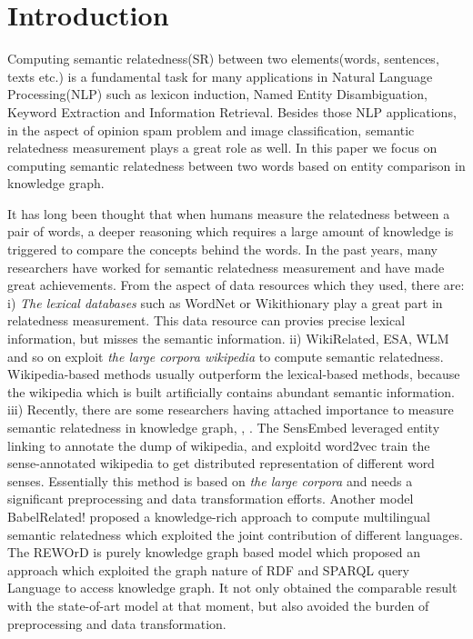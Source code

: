 \section{Introduction}
Computing semantic relatedness(SR) between two elements(words, sentences,
texts etc.) is a fundamental task for many applications in Natural Language
Processing(NLP) such as lexicon induction\cite{aaai/QadirMGL15}, Named 
Entity Disambiguation\cite{acl/HanZ10}, Keyword Extraction
\cite{ijcai/ZhangFW13} and Information Retrieval\cite{acl/GurevychMZ07}. 
Besides those NLP applications, in the aspect of opinion spam problem\cite{www/SandulescuE15}
and image classification\cite{iwcs/LeongM11}, semantic relatedness measurement plays a great role as well. 
In this paper we focus on computing semantic relatedness between two words based on entity comparison in knowledge graph.

It has long been thought that when humans measure the relatedness between a pair of words,
a deeper reasoning which requires a large amount of knowledge is triggered to compare the concepts behind the words.
In the past years, many researchers have worked for semantic relatedness measurement and have made great achievements.
From the aspect of data resources which they used, there are:
i) \emph{The lexical databases} such as WordNet\cite{acl/Pucher07} or Wikithionary\cite{aaai/ZeschMG08} play a great part in
relatedness measurement. This data resource can provies precise lexical information, but misses the semantic information.
ii) WikiRelated\cite{aaai/StrubeP06}, ESA\cite{ijcai/GabrilovichM07}, WLM\cite{aaai/ZeschMG08} and so on exploit \emph{the large corpora wikipedia}
to compute semantic relatedness. Wikipedia-based methods usually outperform the lexical-based methods, 
because the wikipedia which is built artificially contains abundant semantic information. 
iii) Recently, there are some researchers having attached importance to measure semantic relatedness
in knowledge graph\cite{acl/IacobacciPN15}, \cite{aaai/NavigliP12}, \cite{aaai/Pirro12}. 
The SensEmbed \cite{acl/IacobacciPN15} leveraged entity linking to annotate the dump of wikipedia,
and exploitd word2vec\cite{corr/Mikolov13} train the sense-annotated wikipedia to get distributed representation of different 
word senses. Essentially this method is based on \emph{the large corpora} and needs a significant preprocessing
and data transformation efforts. 
Another model BabelRelated!\cite{aaai/NavigliP12} proposed a knowledge-rich approach to compute multilingual semantic
relatedness which exploited the joint contribution of different languages. 
The REWOrD \cite{aaai/Pirro12} is purely knowledge graph based model which proposed an approach which exploited 
the graph nature of RDF and SPARQL query Language to access knowledge graph. It not only obtained the comparable
result with the state-of-art model at that moment, but also avoided the burden of preprocessing and data transformation.

